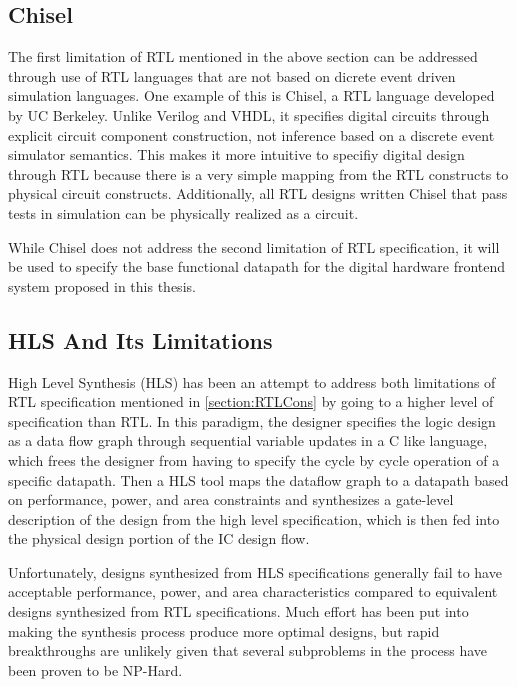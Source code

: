 \subsection{Chisel}
The first limitation of RTL mentioned in the above section can be addressed through use of RTL languages that are not based on dicrete event driven simulation languages. One example of this is Chisel\cite{Bachrach:2012}, a RTL language developed by UC Berkeley. Unlike Verilog and VHDL, it specifies digital circuits through explicit circuit component construction, not inference based on a discrete event simulator semantics. This makes it more intuitive to specifiy digital design through RTL because there is a very simple mapping from the RTL constructs to physical circuit constructs. Additionally, all RTL designs written Chisel that pass tests in simulation can be physically realized as a circuit.

While Chisel does not address the second limitation of RTL specification, it will be used to specify the base functional datapath for the digital hardware frontend system proposed in this thesis.

\subsection{HLS And Its Limitations}
High Level Synthesis (HLS) has been an attempt to address both limitations of RTL specification mentioned in \ref{section:RTLCons} by going to a higher level of specification than RTL. In this paradigm, the designer specifies the logic design as a data flow graph through sequential variable updates in a C like language, which frees the designer from having to specify the cycle by cycle operation of a specific datapath. Then a HLS tool maps the dataflow graph to a datapath based on performance, power, and area constraints and synthesizes a gate-level description of the design from the high level specification, which is then fed into the physical design portion of the IC design flow. 

Unfortunately, designs synthesized from HLS specifications generally fail to have acceptable performance, power, and area characteristics compared to equivalent designs synthesized from RTL specifications. Much effort has been put into making the synthesis process produce more optimal designs, but rapid breakthroughs are unlikely given that several subproblems in the process have been proven to be NP-Hard\cite{McFarlan:1990}.
